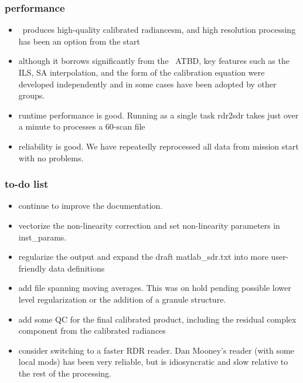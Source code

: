\documentclass[11pt]{beamer}
\begin{document}
\begin{frame}
\frametitle{performance}

\begin{itemize} 
  \item \ccast\ produces high-quality calibrated radiancesm, and
    high resolution processing has been an option from the start

  \item although it borrows significantly from the \noaa\ ATBD, key
    features such as the ILS, SA interpolation, and the form of the
    calibration equation were developed independently and in some
    cases have been adopted by other groups.

  \item runtime performance is good.  Running as a single task
    rdr2sdr takes just over a minute to processes a 60-scan file

  \item reliability is good.  We have repeatedly reprocessed all
    data from mission start with no problems.

\end{itemize} 

\end{frame}
\begin{frame}
\frametitle{to-do list}

\begin{itemize}
  \item continue to improve the documentation.

  \item vectorize the non-linearity correction and set non-linearity
    parameters in inst\_params.

  \item regularize the output and expand the draft matlab\_sdr.txt
    into more user-friendly data definitions

  \item add file spanning moving averages.  This was on hold pending
    possible lower level regularization or the addition of a granule
    structure.

  \item add some QC for the final calibrated product, including the
    residual complex component from the calibrated radiances

  \item consider switching to a faster RDR reader.  Dan Mooney's
    reader (with some local mods) has been very reliable, but is
    idiosyncratic and slow relative to the rest of the processing.

\end{itemize}

\end{frame}
\end{document}
